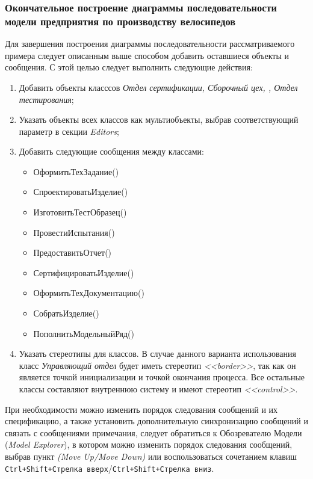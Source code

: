 \documentclass[a4paper,12pt]{report}
\begin{document}
\subsubsection*{Окончательное построение диаграммы последовательности модели предприятия по производству велосипедов}
Для завершения построения диаграммы последовательности рассматриваемого примера следует описанным выше способом добавить оставшиеся объекты и сообщения. С этой целью следует выполнить следующие действия:
\begin{enumerate}
	\item Добавить объекты класссов \textit{Отдел сертификации, Сборочный цех, , Отдел тестирования};
	\item Указать объекты всех классов как мультиобъекты, выбрав соответствующий параметр в секции \textit{Editors};
	\item Добавить следующие сообщения между классами:
	\begin{itemize}
		\item ОформитьТехЗадание() 
		\item СпроектироватьИзделие()
		\item ИзготовитьТестОбразец()
		\item ПровестиИспытания()
		\item ПредоставитьОтчет()
		\item СертифицироватьИзделие()
		\item ОформитьТехДокументацию()
		\item СобратьИзделие()
		\item ПополнитьМодельныйРяд()
	\end{itemize}
	\item Указать стереотипы для классов. В случае данного варианта использования класс \textit{Управляющий отдел} будет иметь стереотип \textit{<<border>>}, так как он является точкой инициализации и точкой окончания процесса. Все остальные классы составляют внутреннюю систему и имеют стереотип \textit{<<control>>}.
\end{enumerate}

При необходимости можно изменить порядок следования сообщений и их спецификацию, а также установить дополнительную синхронизацию сообщений и связать с сообщениями примечания, следует обратиться к Обозревателю Модели (\textit{Model Explorer}), в котором можно изменить порядок следования сообщений, выбрав пункт \textit{(Move Up/Move Down)} или воспользоваться сочетанием клавиш \texttt{Ctrl+Shift+Стрелка вверх}/\texttt{Ctrl+Shift+Стрелка вниз}.
\end{document}
